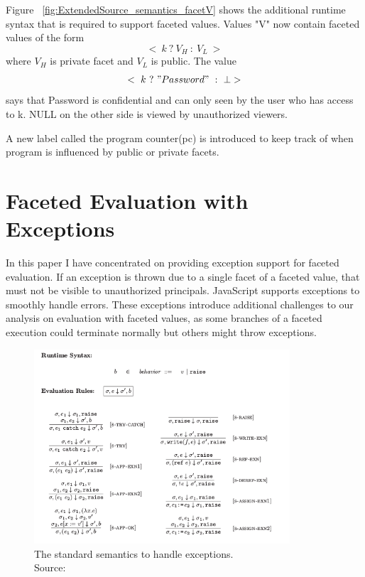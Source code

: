 Figure ~\ref{fig:ExtendedSource_semantics_facetV} shows the additional runtime syntax that is required to support faceted values. Values "V" now contain faceted values of the form
$$
<\ k\ ?\ V_{H}\ :\ V_{L}\ >
$$
where $V_{H}$ is private facet and $V_{L}$ is public. The value 
$$
<\ k\ ?\ "Password"\ :\ \bot> 
$$
says that Password is confidential and can only seen by the user who has access to k.
NULL on the other side is viewed by unauthorized viewers.

A new label called the program counter(pc) is introduced to keep track of when program is influenced by public or private facets.
	
\section{Faceted Evaluation with Exceptions}
In this paper I have concentrated on providing exception support for faceted evaluation. If an exception is thrown due to a single facet of a faceted value, that must not be visible to unauthorized principals. JavaScript supports exceptions to smoothly handle errors. These exceptions introduce additional challenges to our analysis on evaluation with faceted values, as some branches of a faceted execution could terminate normally but others might throw exceptions.

\begin{figure}
\centering
\includegraphics[width=0.85\textwidth]{images/fig3.png}
\caption[The Standard semantics to handle exceptions.]{The standard semantics to handle exceptions. \\ Source:  ~\cite{bib4}} 
\label{fig:exception_semantics}
\end{figure}

